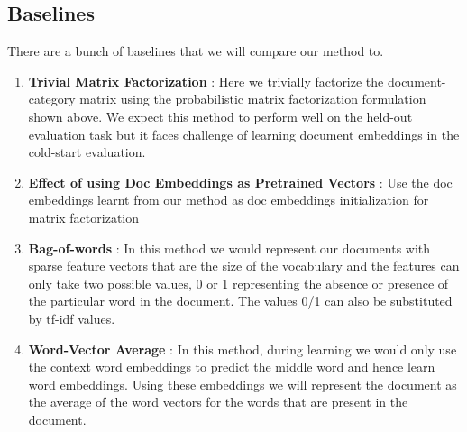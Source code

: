 \documentclass{article}
\begin{document}
\subsection{Baselines}
There are a bunch of baselines that we will compare our method to. 
\begin{enumerate}
\item \textbf{Trivial Matrix Factorization} : Here we trivially factorize the document-category matrix using the probabilistic matrix factorization formulation shown above. We expect this method to perform well on the held-out evaluation task but it faces challenge of learning document embeddings in the cold-start evaluation.

\item \textbf{Effect of using Doc Embeddings as Pretrained Vectors} : Use the doc embeddings learnt from our method as doc embeddings initialization for matrix factorization

\item \textbf{Bag-of-words} : In this method we would represent our documents with sparse feature vectors that are the size of the vocabulary and the features can only take two possible values, 0 or 1 representing the absence or presence of the particular word in the document. The values 0/1 can also be substituted by tf-idf values.

\item \textbf{Word-Vector Average} : In this method, during learning we would only use the context word embeddings to predict the middle word and hence learn word embeddings. Using these embeddings we will represent the document as the average of the word vectors for the words that are present in the document.

\end{enumerate}
\end{document}
